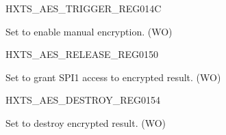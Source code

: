\begin{register}{H}{XTS\_AES\_TRIGGER\_REG}{\hexprefix{}014C}\label{regdesc:XTSAESTRIGGERREG}
%
%
\regnewline%
\begin{regdesc}\begin{reglist}
\label{fielddesc:XTSAESTRIGGER}\item [XTS\_AES\_TRIGGER] Set to enable manual encryption. (WO)
\end{reglist}\end{regdesc}
\end{register}


\begin{register}{H}{XTS\_AES\_RELEASE\_REG}{\hexprefix{}0150}\label{regdesc:XTSAESRELEASEREG}
%
%
\regnewline%
\begin{regdesc}\begin{reglist}
\label{fielddesc:XTSAESRELEASE}\item [XTS\_AES\_RELEASE] Set to grant SPI1 access to encrypted result. (WO)
\end{reglist}\end{regdesc}
\end{register}


\begin{register}{H}{XTS\_AES\_DESTROY\_REG}{\hexprefix{}0154}\label{regdesc:XTSAESDESTROYREG}
%
%
\regnewline%
\begin{regdesc}\begin{reglist}
\label{fielddesc:XTSAESDESTROY}\item [XTS\_AES\_DESTROY] Set to destroy encrypted result. (WO)
\end{reglist}\end{regdesc}
\end{register}



